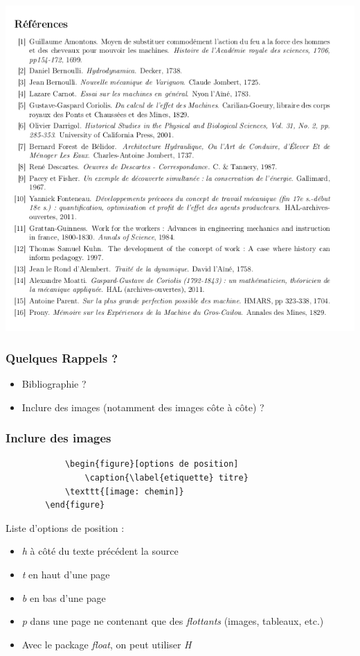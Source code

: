 \documentclass[handout]{beamer}
\begin{document}
	\begin{frame}

		\centering

		\includegraphics[scale=0.45]{Images/Rappels/biblio.png}

	\end{frame}

	\begin{frame}
		\frametitle{Quelques Rappels ?}
		\begin{itemize}
			\item Bibliographie ?
			\item Inclure des images (notamment des images côte à côte) ?
		\end{itemize}
	\end{frame}

	\begin{frame}[fragile=singleslide]
		\frametitle{Inclure des images}

		\centering
		\begin{verbatim}
			\begin{figure}[options de position]
				\caption{\label{etiquette} titre}
			\texttt{[image: chemin]}
		\end{figure}
		\end{verbatim}

		Liste d'options de position :
		\begin{itemize}
			\item \textit{h} à côté du texte précédent la source
			\item \textit{t} en haut d'une page
			\item \textit{b} en bas d'une page
			\item \textit{p} dans une page ne contenant que des \emph{flottants} (images, tableaux, etc.)
			\item Avec le package \textit{float}, on peut utiliser \textit{H}
		\end{itemize}

	\end{frame}
\end{document}
